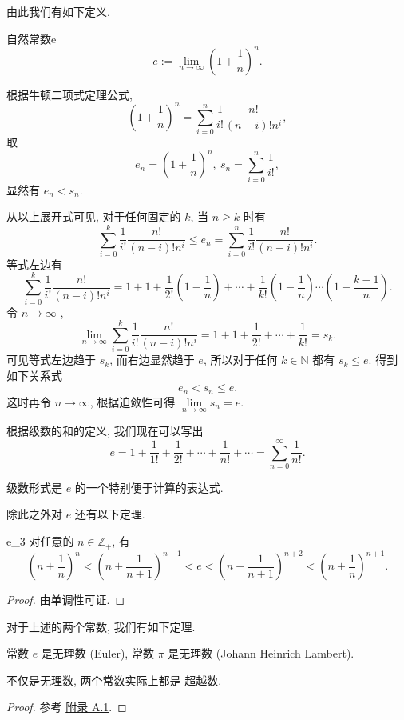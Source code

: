 \documentclass[cn,toc=twocol]{elegantbook}
\newcommand{\N}{\mathbb{N}}
\newcommand{\Z}{\mathbb{Z}}
\begin{document}
由此我们有如下定义.

\begin{definition}{自然常数}{e}
\[
	e := \lim_{n\to\infty} \left(1 + \frac{1}{n}\right)^n.
\]
\end{definition}

根据牛顿二项式定理公式,
\[
	\left(1 + \frac1n\right)^n = \sum_{i = 0}^{n} \frac{1}{i!} \frac{n!}{(n-i)!n^i},
\]
取
\[
	e_n =  \left(1 + \frac1n\right)^n,\ s_n = \sum_{i = 0}^{n} \frac{1}{i!},
\]
显然有 $e_n < s_n$.

从以上展开式可见, 对于任何固定的 $k$, 当 $n \ge k$ 时有
\[
	\sum_{i = 0}^{k} \frac{1}{i!} \frac{n!}{(n-i)!n^i} \le e_n = \sum_{i = 0}^{n} \frac{1}{i!} \frac{n!}{(n-i)!n^i}.
\]
等式左边有
\[
	\sum_{i = 0}^{k} \frac{1}{i!} \frac{n!}{(n-i)!n^i} = 1 + 1 + \frac{1}{2!}\left(1-\frac1n\right) + \cdots + \frac{1}{k!}\left(1-\frac1n\right)\cdots\left(1-\frac{k-1}{n}\right).
\]
令 $n \to \infty$ , 
\[
	\lim_{n\to\infty}\sum_{i = 0}^{k} \frac{1}{i!} \frac{n!}{(n-i)!n^i} = 1 + 1 + \frac{1}{2!} + \cdots + \frac{1}{k!}
	= s_k.
\]
可见等式左边趋于 $s_k$, 而右边显然趋于 $e$, 所以对于任何 $k \in \N$ 都有 $s_k \le e$. 得到如下关系式
\[
	e_n < s_n \le e.
\]
这时再令 $n \to \infty$, 根据迫敛性可得 $\lim\limits_{n\to\infty} s_n = e$.

根据级数的和的定义, 我们现在可以写出
\[
	e = 1 + \frac1{1!} + \frac1{2!} + \cdots + \frac1{n!} + \cdots = \sum_{n=0}^\infty \frac{1}{n!}.
\]

级数形式是 $e$ 的一个特别便于计算的表达式.

除此之外对 $e$ 还有以下定理.

\begin{theorem}{}{e_3}
对任意的 $n \in \Z_+$, 有
\[
	\left(n + \frac1{n}\right)^{n} < \left(n + \frac1{n + 1}\right)^{n + 1} < e < \left(n + \frac1{n+1}\right)^{n + 2} < \left(n + \frac1{n}\right)^{n + 1}.
\]	
\end{theorem}

\begin{proof}
	由单调性可证.
\end{proof}



对于上述的两个常数, 我们有如下定理.
\begin{theorem}
	常数 $e$ 是无理数 (Euler), 常数 $\pi$ 是无理数 (Johann Heinrich Lambert).
\end{theorem} 
\begin{remark}
	不仅是无理数, 两个常数实际上都是 \hyperref[def:transcendental]{超越数}.	
\end{remark}
\begin{proof}
	参考 \hyperlink{A1}{附录 A.1}.
\end{proof}
\bigskip
\end{document}
